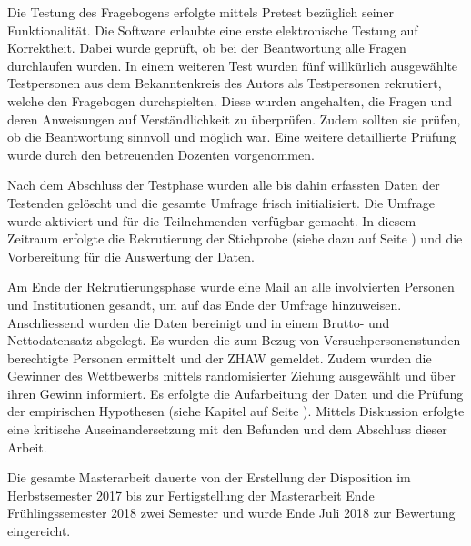 Die Testung des Fragebogens erfolgte mittels Pretest bezüglich seiner Funktionalität. Die Software erlaubte eine erste elektronische Testung auf Korrektheit. Dabei wurde geprüft, ob bei der Beantwortung alle Fragen durchlaufen wurden. In einem weiteren Test wurden fünf willkürlich ausgewählte Testpersonen aus dem Bekanntenkreis des Autors als Testpersonen rekrutiert, welche den Fragebogen durchspielten. Diese wurden angehalten, die Fragen und deren Anweisungen auf Verständlichkeit zu überprüfen. Zudem sollten sie prüfen, ob die Beantwortung sinnvoll und möglich war. Eine weitere detaillierte Prüfung wurde durch den betreuenden Dozenten vorgenommen. 

Nach dem Abschluss der Testphase wurden alle bis dahin erfassten Daten der Testenden gelöscht und die gesamte Umfrage frisch initialisiert. Die Umfrage wurde aktiviert und für die Teilnehmenden verfügbar gemacht. In diesem Zeitraum erfolgte die Rekrutierung der Stichprobe (siehe dazu \textit{} auf Seite \pageref{sec:Datenerhebung}) und die Vorbereitung für die Auswertung der Daten. 

Am Ende der Rekrutierungsphase wurde eine Mail an alle involvierten Personen und Institutionen gesandt, um auf das Ende der Umfrage hinzuweisen. Anschliessend wurden die Daten bereinigt und in einem Brutto- und Nettodatensatz abgelegt. Es wurden die zum Bezug von Versuchpersonenstunden berechtigte Personen ermittelt und der ZHAW gemeldet. Zudem wurden die Gewinner des Wettbewerbs mittels randomisierter Ziehung ausgewählt und über ihren Gewinn informiert. Es erfolgte die Aufarbeitung der Daten und die Prüfung der empirischen Hypothesen (siehe Kapitel \textit{} auf Seite \pageref{sec:EmpirischeHypothesen}). Mittels Diskussion erfolgte eine kritische Auseinandersetzung mit den Befunden und dem Abschluss dieser Arbeit.

Die gesamte Masterarbeit dauerte von der Erstellung der Disposition im Herbstsemester 2017 bis zur Fertigstellung der Masterarbeit Ende Frühlingssemester 2018 zwei Semester und wurde Ende Juli 2018 zur Bewertung eingereicht.

